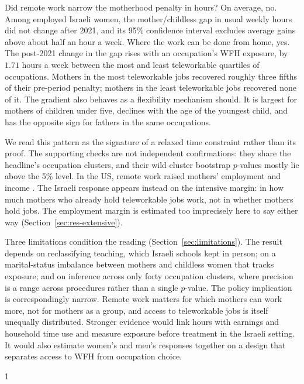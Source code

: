 \documentclass[12pt,a4paper]{article}
\begin{document}
Did remote work narrow the motherhood penalty in hours? On average, no. Among employed Israeli
women, the mother/childless gap in usual weekly hours did not change after 2021, and its 95\%
confidence interval excludes average gains above about half an hour a week. Where the work can
be done from home, yes. The post-2021 change in the gap rises with an occupation's WFH exposure,
by $1.71$ hours a week between the most and least teleworkable quartiles of occupations. Mothers
in the most teleworkable jobs recovered roughly three fifths of their pre-period penalty; mothers
in the least teleworkable jobs recovered none of it. The gradient also behaves as a flexibility
mechanism should. It is largest for mothers of children under five, declines with the age of the
youngest child, and has the opposite sign for fathers in the same occupations.

\noindent We read this pattern as the signature of a relaxed time constraint \citep{goldin2014}
rather than its proof. The supporting checks are not independent confirmations: they share the
headline's occupation clusters, and their wild cluster bootstrap $p$-values mostly lie above the
5\% level. In the US, remote work raised mothers' employment and income \citep{harrington2025}.
The Israeli response appears instead on the intensive margin: in how much mothers who already
hold teleworkable jobs work, not in whether mothers hold jobs. The employment margin is estimated
too imprecisely here to say either way (Section~\ref{sec:res-extensive}).

\noindent Three limitations condition the reading (Section~\ref{sec:limitations}). The result
depends on reclassifying teaching, which Israeli schools kept in person; on a marital-status
imbalance between mothers and childless women that tracks exposure; and on inference across only
forty occupation clusters, where precision is a range across procedures rather than a single
$p$-value. The policy implication is correspondingly narrow. Remote work matters for which
mothers can work more, not for mothers as a group, and access to teleworkable jobs is itself
unequally distributed. Stronger evidence would link hours with earnings and household time use
and measure exposure before treatment in the Israeli setting. It would also estimate women's and
men's responses together on a design that separates access to WFH from occupation choice.

\newpage
\begin{spacing}{1}


\end{spacing}

\appendix
\setcounter{table}{0}
\setcounter{figure}{0}

\end{document}
